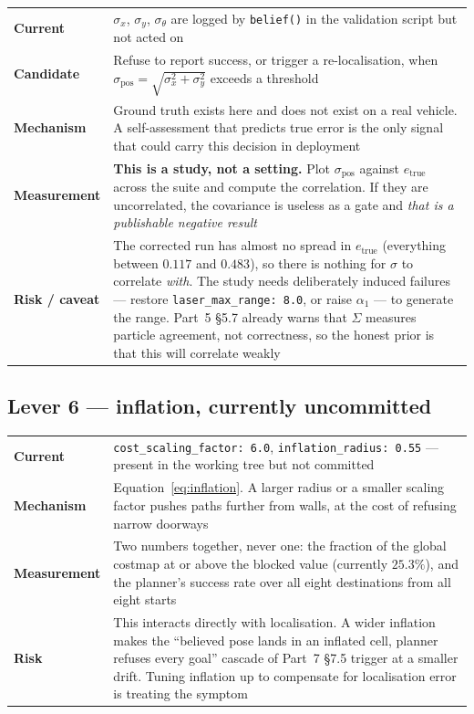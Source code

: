 \documentclass[11pt,a4paper]{report}
\newcommand{\file}[1]{\texttt{\small #1}}
\begin{document}
\begin{center}
\small
\begin{tabular}{@{}p{}p{}@{}}
\toprule
\textbf{Current} & $\sigma_x$, $\sigma_y$, $\sigma_\theta$ are logged by
  \file{belief()} in the validation script but not acted on \\
\textbf{Candidate} & Refuse to report success, or trigger a re-localisation,
  when $\sigma_{\text{pos}} = \sqrt{\sigma_x^2 + \sigma_y^2}$ exceeds a
  threshold \\
\textbf{Mechanism} & Ground truth exists here and does not exist on a real
  vehicle. A self-assessment that predicts true error is the only signal that
  could carry this decision in deployment \\
\textbf{Measurement} & \textbf{This is a study, not a setting.} Plot
  $\sigma_{\text{pos}}$ against $e_{\text{true}}$ across the suite and compute
  the correlation. If they are uncorrelated, the covariance is useless as a
  gate and \emph{that is a publishable negative result} \\
\textbf{Risk / caveat} & The corrected run has almost no spread in
  $e_{\text{true}}$ (everything between $0.117$ and $0.483$), so there is
  nothing for $\sigma$ to correlate \emph{with}. The study needs deliberately
  induced failures --- restore \file{laser\_max\_range: 8.0}, or raise
  $\alpha_1$ --- to generate the range. Part~5 \S5.7 already warns that
  $\Sigma$ measures particle agreement, not correctness, so the honest prior is
  that this will correlate weakly \\
\bottomrule
\end{tabular}
\end{center}

\subsection{Lever 6 --- inflation, currently uncommitted}

\begin{center}
\small
\begin{tabular}{@{}p{}p{}@{}}
\toprule
\textbf{Current} & \file{cost\_scaling\_factor: 6.0}, \file{inflation\_radius: 0.55}
  --- present in the working tree but not committed \\
\textbf{Mechanism} & Equation~\eqref{eq:inflation}. A larger radius or a
  smaller scaling factor pushes paths further from walls, at the cost of
  refusing narrow doorways \\
\textbf{Measurement} & Two numbers together, never one: the fraction of the
  global costmap at or above the blocked value (currently $25.3\%$), and the
  planner's success rate over all eight destinations from all eight starts \\
\textbf{Risk} & This interacts directly with localisation. A wider inflation
  makes the ``believed pose lands in an inflated cell, planner refuses every
  goal'' cascade of Part~7 \S7.5 trigger at a smaller drift. Tuning inflation
  up to compensate for localisation error is treating the symptom \\
\bottomrule
\end{tabular}
\end{center}
\end{document}
